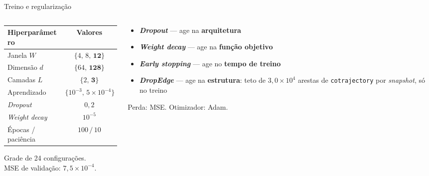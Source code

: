 \documentclass[aspectratio=169]{beamer}
\newcommand{\dest}[1]{\textcolor{ufprB}{\textbf{#1}}}
\newcommand{\azul}[1]{\textcolor{ufprA}{\textbf{#1}}}
\begin{document}
\begin{frame}{Treino e regularização}
  \begin{columns}[T]
  \begin{column}{0.46\textwidth}
    \begin{center}
    \small
    \begin{tabular}{lc}
    \toprule
    \textbf{Hiperparâmetro} & \textbf{Valores} \\
    \midrule
    Janela $W$  & $\{4,\,8,\,\mathbf{12}\}$ \\
    Dimensão $d$   & $\{64,\,\mathbf{128}\}$ \\
    Camadas $L$    & $\{2,\,\mathbf{3}\}$ \\
    Aprendizado & $\{10^{-3},\,5\!\times\!10^{-4}\}$ \\
    \midrule
    \emph{Dropout}        & $0{,}2$ \\
    \emph{Weight decay}   & $10^{-5}$ \\
    Épocas / paciência    & $100\,/\,10$ \\
    \bottomrule
    \end{tabular}
    \end{center}
    {\footnotesize Grade de 24 configurações.\\ MSE de validação: $7{,}5\times10^{-4}$.}
  \end{column}
  \begin{column}{0.54\textwidth}
    \vspace{0.4em}
    \begin{itemize}
      \item \dest{\emph{Dropout}} --- age na \azul{arquitetura}
      \item \dest{\emph{Weight decay}} --- age na \azul{função objetivo}
      \item \dest{\emph{Early stopping}} --- age no \azul{tempo de treino}
      \item \dest{\emph{DropEdge}} --- age na \azul{estrutura}: teto de $3{,}0\times10^{4}$ arestas
            de \texttt{cotrajectory} por \emph{snapshot}, \alert{só no treino}
    \end{itemize}
    \vspace{0.8em}
    \begin{center}
    \small Perda: MSE. \quad Otimizador: Adam.
    \end{center}
  \end{column}
  \end{columns}
\end{frame}
\end{document}
